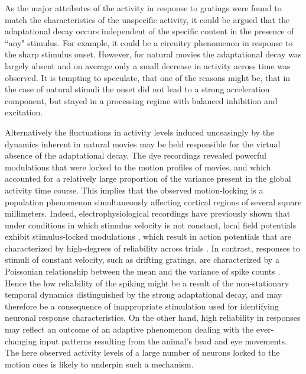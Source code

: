 As the major attributes of the activity in response to gratings were found
to match the characteristics of the unspecific activity, it could be argued
that the adaptational decay occurs independent of the specific content in
the presence of ``any" stimulus. For example, it could be a circuitry
phenomenon in response to the sharp stimulus onset. However, for natural
movies the adaptational decay was largely absent and on average only a
small decrease in activity across time was observed. It is tempting to
speculate, that one of the reasons might be, that in the case of natural
stimuli the onset did not lead to a strong acceleration component, but
stayed in a processing regime with balanced inhibition and excitation. 

Alternatively the fluctuations in activity levels induced unceasingly by
the dynamics inherent in natural movies may be held responsible for the
virtual absence of the adaptational decay. The dye recordings revealed
powerful modulations that were locked to the motion profiles of movies, and
which accounted for a relatively large proportion of the variance present
in the global activity time course. This implies that the observed
motion-locking is a population phenomenon simultaneously affecting cortical
regions of several square millimeters. Indeed, electrophysiological
recordings have previously shown that under conditions in which stimulus
velocity is not constant, local field potentials exhibit stimulus-locked
modulations \citep{kayser2004a, schall2009a, mazzoni2008a}, which result in
action potentials that are characterized by high-degrees of reliability
across trials \citep{mainen1995a}. In contrast, responses to stimuli of
constant velocity, such as drifting gratings, are characterized by a
Poissonian relationship between the mean and the variance of spike counts
\citep{ruyter-van-steveninck1997a}. Hence the low reliability of the
spiking might be a result of the non-stationary temporal dynamics
distinguished by the strong adaptational decay, and may therefore be a
consequence of inappropriate stimulation used for identifying neuronal
response characteristics. On the other hand, high reliability in responses
may reflect an outcome of an adaptive phenomenon dealing with the
ever-changing input patterns resulting from the animal's head and eye
movements. The here observed activity levels of a large number of neurons
locked to the motion cues is likely to underpin such a mechanism.

